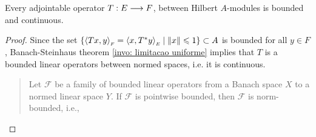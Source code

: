 \begin{proposicao}
    Every adjointable operator $T:E \longrightarrow F$, between Hilbert $A$-modules is bounded and continuous.
     \begin{proof}
         Since the set $\{\sub{\inner{Tx}y}F = \sub{\inner{x}{T^*y}}E \mid \|x\|\leq 1\} \subset A$ is bounded for all $y \in F$, Banach-Steinhaus theorem \ref{invo: limitacao uniforme} implies that $T$ is a bounded linear operators between normed spaces, i.e. it is continuous. \qedhere
         \begin{quote}
             \begin{invocacao}
         \label{invo: limitacao uniforme}
         Let $\mathcal{F}$ be a family of bounded linear operators from a Banach space $X$ to a normed linear space $Y$. If $\mathcal{F}$ is pointwise bounded, then $\mathcal{F}$ is norm-bounded, i.e., 


\end{invocacao}
\end{quote}
\end{proof}
\end{proposicao}
